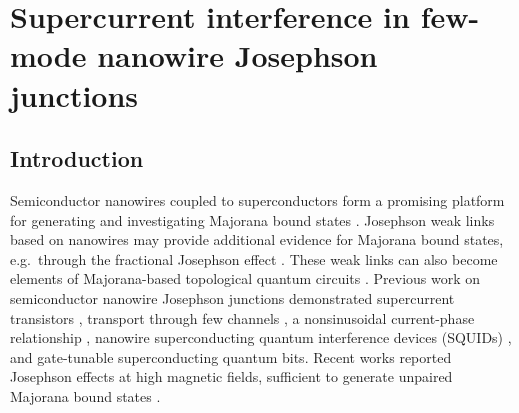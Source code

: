 \chapter{Supercurrent interference in few-mode nanowire Josephson junctions}
\label{ch:supercurrent}


\newpage
\noindent
\section{Introduction}

Semiconductor nanowires coupled to superconductors form a promising platform for generating and investigating Majorana bound states \cite{Kitaev2001,Oreg2010,Lutchyn2010,Mourik2012,Deng2016,Albrecht2016,Chen2017a}.
Josephson weak links based on nanowires may provide additional evidence for Majorana bound states, e.g.~through the fractional Josephson effect \cite{Wiedenmann2016,Bocquillon2016,Deacon2017}.
These weak links can also become elements of Majorana-based topological quantum circuits \cite{Hyart2013, Aasen2016, Karzig2017, Plugge2017}.
Previous work on semiconductor nanowire Josephson junctions demonstrated supercurrent transistors \cite{Doh2005}, transport through few channels \cite{Goffman2017}, a nonsinusoidal current-phase relationship \cite{Spanton2017}, nanowire superconducting quantum interference devices (SQUIDs) \cite{Dam2006,Szombati2016}, and gate-tunable superconducting quantum bits\cite{Lange2015,Larsen2015}.
Recent works reported Josephson effects at high magnetic fields, sufficient to generate unpaired Majorana bound states \cite{Szombati2016,Paajaste2015,Tiira2017,Gharavi2017}.

